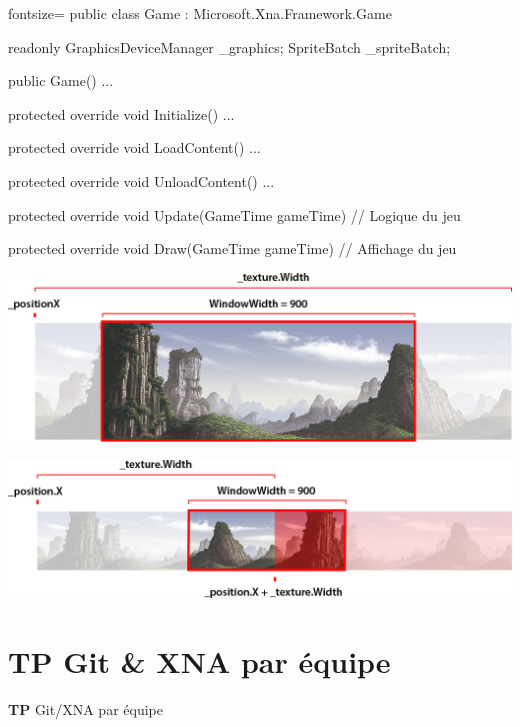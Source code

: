 \documentclass[12pt]{beamer}
\begin{document}
\begin{frame}[fragile]
    \begin{csharpcode*}{fontsize=\scriptsize}
        public class Game : Microsoft.Xna.Framework.Game
        {
            readonly GraphicsDeviceManager _graphics;
            SpriteBatch _spriteBatch;

            public Game() { ... }

            protected override void Initialize() { ... }

            protected override void LoadContent() { ... }

            protected override void UnloadContent() { ... }

            protected override void Update(GameTime gameTime)
            {
                // Logique du jeu
            }

            protected override void Draw(GameTime gameTime)
            {
                // Affichage du jeu
            }
        }
    \end{csharpcode*}
\end{frame}

\begin{frame}
    \begin{center}
        \vspace{1cm}
        \includegraphics[scale=0.26]{img/bg1.png}
    \end{center}
\end{frame}

\begin{frame}
    \begin{center}
        \vspace{1cm} 
        \includegraphics[scale=0.26]{img/bg2.png}
    \end{center}
\end{frame}

\section{TP Git \& XNA par équipe}

\begingroup
{}
\begin{frame}
    \begin{center}
        \vspace{1cm}
        {\Large\color{background} \textbf{TP} Git/XNA par équipe}
    \end{center}
\end{frame}
\endgroup
\end{document}
